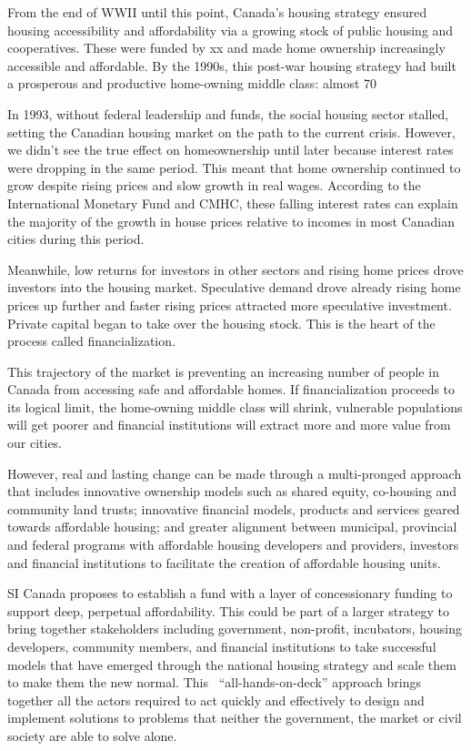 From the end of WWII until this point, Canada’s housing strategy ensured housing accessibility and affordability via a growing stock of public housing and cooperatives. These were funded by xx and made home ownership increasingly accessible and affordable. By the 1990s, this post-war housing strategy had built a prosperous and productive home-owning middle class: almost 70%

In 1993, without federal leadership and funds, the social housing sector stalled, setting the Canadian housing market on the path to the current crisis. However, we didn’t see the true effect on homeownership until later because interest rates were dropping in the same period. This meant that home ownership continued to grow despite rising prices and slow growth in real wages. According to the International Monetary Fund and CMHC, these falling interest rates can explain the majority of the growth in house prices relative to incomes in most Canadian cities during this period. 

Meanwhile, low returns for investors in other sectors and rising home prices drove investors into the housing market. Speculative demand drove already rising home prices up further and faster rising prices attracted more speculative investment. Private capital began to take over the housing stock. This is the heart of the process called financialization. 

This trajectory of the market is preventing an increasing number of people in Canada from accessing safe and affordable homes. If financialization proceeds to its logical limit, the home-owning middle class will shrink, vulnerable populations will get poorer and financial institutions will extract more and more value from our cities.

However, real and lasting change can be made through a multi-pronged approach that includes innovative ownership models such as shared equity, co-housing and community land trusts; innovative financial models, products and services geared towards affordable housing; and greater alignment between municipal, provincial and federal programs with affordable housing developers and providers, investors and financial institutions to facilitate the creation of affordable housing units.

SI Canada proposes to establish a fund with a layer of concessionary funding to support deep, perpetual affordability. This could be part of a larger strategy to bring together stakeholders including government, non-profit, incubators, housing developers, community members, and financial institutions to take successful models that have emerged through the national housing strategy and scale them to make them the new normal. This  “all-hands-on-deck” approach brings together all the actors required to act quickly and effectively to design and implement solutions to problems that neither the government, the market or civil society are able to solve alone.  

